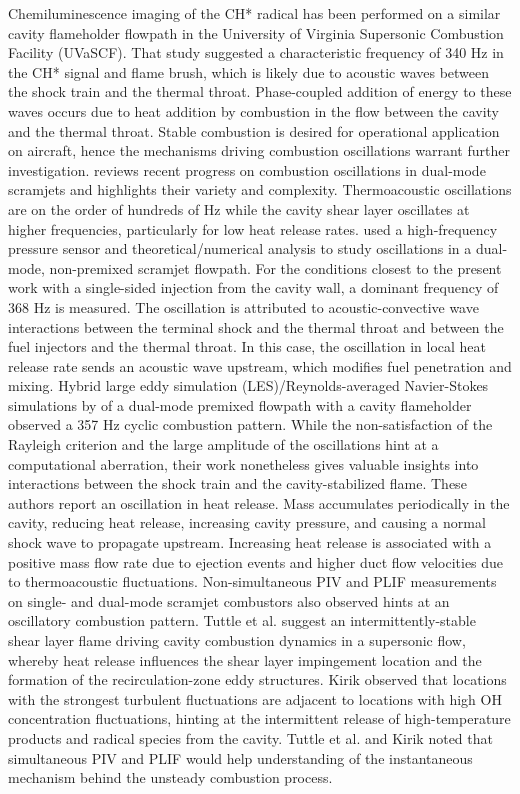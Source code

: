 Chemiluminescence imaging of the CH* radical has been performed \cite{AllisonFredericksonKirikEtAl2017}  on a similar cavity flameholder flowpath in the University of Virginia Supersonic Combustion Facility (UVaSCF). That study suggested a characteristic frequency of 340 Hz in the CH* signal and flame brush, which is likely due to acoustic waves between the shock train and the thermal throat. Phase-coupled addition of energy to these waves occurs due to heat addition by combustion in the flow between the cavity and the thermal throat. 
Stable combustion is desired for operational application on aircraft, hence the mechanisms driving combustion oscillations warrant further investigation.
\citet{WangWangSun2014} reviews recent progress on combustion oscillations in dual-mode scramjets and highlights their variety and complexity. Thermoacoustic oscillations are on the order of hundreds of Hz while the cavity shear layer oscillates at higher frequencies, particularly for low heat release rates.  
\citet{LinJacksonBehdadniaEtAl2010} used a high-frequency pressure sensor and theoretical/numerical analysis to study oscillations in a dual-mode, non-premixed scramjet flowpath. For the conditions closest to the present work with a single-sided injection from the cavity wall, a dominant frequency of 368 Hz is measured. The oscillation is attributed to acoustic-convective wave interactions between the terminal shock and the thermal throat and between the fuel injectors and the thermal throat. In this case, the oscillation in local heat release rate sends an acoustic wave upstream, which modifies fuel penetration and mixing. 
Hybrid large eddy simulation (LES)/Reynolds-averaged Navier-Stokes simulations by \citet{ramesh2015large} of a dual-mode premixed flowpath with a cavity flameholder observed a 357 Hz cyclic combustion pattern. While the non-satisfaction of the Rayleigh criterion and the large amplitude of the oscillations hint at a computational aberration, their work nonetheless gives valuable insights into interactions between the shock train and the cavity-stabilized flame. These authors report an oscillation in heat release. Mass accumulates periodically in the cavity, reducing heat release, increasing cavity pressure, and causing a normal shock wave to propagate upstream. Increasing heat release is associated with a positive mass flow rate due to ejection events and higher duct flow velocities due to thermoacoustic fluctuations.
Non-simultaneous PIV and PLIF measurements on single- and dual-mode scramjet combustors also observed hints at an oscillatory combustion pattern. 
Tuttle et al. \cite{TuttleCarterHsu2014} suggest an intermittently-stable shear layer flame driving cavity combustion dynamics in a supersonic flow, whereby heat release influences the shear layer impingement location and the formation of the recirculation-zone eddy structures.
Kirik \cite{Kirik2017} observed that locations with the strongest turbulent fluctuations are adjacent to locations with high OH concentration fluctuations, hinting at the intermittent release of high-temperature products and radical species from the cavity.  
Tuttle et al. \cite{TuttleCarterHsu2014} and Kirik \cite{Kirik2017} noted that simultaneous PIV and PLIF would help understanding of the instantaneous mechanism behind the unsteady combustion process. 


